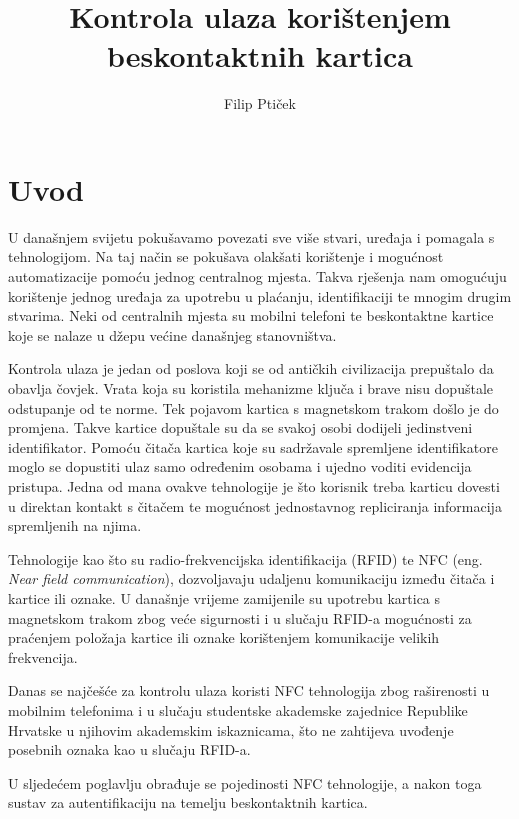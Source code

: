 \documentclass[times, utf8, zavrsni]{fer}
\begin{document}

\title{Kontrola ulaza korištenjem beskontaktnih kartica}

\author{Filip Ptiček}

\maketitle

\izvornik

\zahvala{}

\tableofcontents			

\chapter{Uvod}
U današnjem svijetu pokušavamo povezati sve više stvari, uređaja i pomagala s tehnologijom. Na taj način se pokušava olakšati korištenje i mogućnost automatizacije pomoću jednog centralnog mjesta. Takva rješenja nam omogućuju korištenje jednog uređaja za upotrebu u plaćanju, identifikaciji te mnogim drugim stvarima. Neki od centralnih mjesta su mobilni telefoni te beskontaktne kartice koje se nalaze u džepu većine današnjeg stanovništva.\par
Kontrola ulaza je jedan od poslova koji se od antičkih civilizacija prepuštalo da obavlja čovjek. Vrata koja su koristila mehanizme ključa i brave nisu dopuštale odstupanje od te norme. Tek pojavom kartica s magnetskom trakom došlo je do promjena. Takve kartice dopuštale su da se svakoj osobi dodijeli jedinstveni identifikator. Pomoću čitača kartica koje su sadržavale spremljene identifikatore moglo se dopustiti ulaz samo određenim osobama i ujedno voditi evidencija pristupa. Jedna od mana ovakve tehnologije je što korisnik treba karticu dovesti u direktan kontakt s čitačem te mogućnost jednostavnog repliciranja informacija spremljenih na njima.\par
Tehnologije kao što su radio-frekvencijska identifikacija (RFID) te NFC (eng. \textit{Near field communication}), dozvoljavaju udaljenu komunikaciju između čitača i kartice ili oznake. U današnje vrijeme zamijenile su upotrebu kartica s magnetskom trakom zbog veće sigurnosti i u slučaju RFID-a mogućnosti za praćenjem položaja kartice ili oznake korištenjem komunikacije velikih frekvencija.\par
Danas se najčešće za kontrolu ulaza koristi NFC tehnologija zbog raširenosti u mobilnim telefonima i u slučaju studentske akademske zajednice Republike Hrvatske u njihovim akademskim iskaznicama, što ne zahtijeva uvođenje posebnih oznaka kao u slučaju RFID-a. \par 
U sljedećem poglavlju obrađuje se pojedinosti NFC tehnologije, a nakon toga sustav za autentifikaciju na temelju beskontaktnih kartica.
\end{document}

